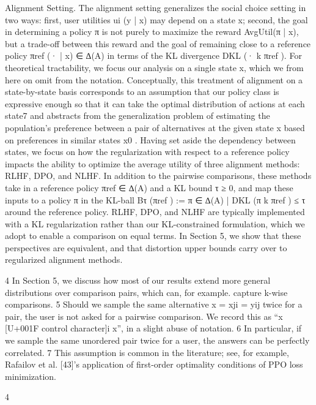 \documentclass[10pt]{article}
\begin{document}
\begin{ReviewVerbatim}

Alignment Setting. The alignment setting generalizes the social choice setting in two ways: first,
user utilities ui (y | x) may depend on a state x; second, the goal in determining a policy π is not
purely to maximize the reward AvgUtil(π | x), but a trade-off between this reward and the goal of
remaining close to a reference policy πref (· | x) ∈ ∆(A) in terms of the KL divergence DKL (· k πref ).
For theoretical tractability, we focus our analysis on a single state x, which we from here on omit
from the notation. Conceptually, this treatment of alignment on a state-by-state basis corresponds to
an assumption that our policy class is expressive enough so that it can take the optimal distribution of
actions at each state7 and abstracts from the generalization problem of estimating the population’s
preference between a pair of alternatives at the given state x based on preferences in similar states x0 .
Having set aside the dependency between states, we focus on how the regularization with respect
to a reference policy impacts the ability to optimize the average utility of three alignment methods:
RLHF, DPO, and NLHF. In addition to the pairwise comparisons, these methods take in a reference
policy πref ∈ ∆(A) and a KL bound τ ≥ 0, and map these inputs to a policy π in the KL-ball
Bτ (πref ) := {π ∈ ∆(A) | DKL (π k πref ) ≤ τ } around the reference policy. RLHF, DPO, and NLHF
are typically implemented with a KL regularization rather than our KL-constrained formulation,
which we adopt to enable a comparison on equal terms. In Section 5, we show that these perspectives
are equivalent, and that distortion upper bounds carry over to regularized alignment methods.

   4
     In Section 5, we discuss how most of our results extend more general distributions over comparison pairs,
which can, for example. capture k-wise comparisons.
   5
     Should we sample the same alternative x = xji = yij twice for a pair, the user is not asked for a pairwise
comparison. We record this as “x [U+001F control character]i x”, in a slight abuse of notation.
   6
     In particular, if we sample the same unordered pair twice for a user, the answers can be perfectly correlated.
   7
     This assumption is common in the literature; see, for example, Rafailov et al. [43]’s application of first-order
optimality conditions of PPO loss minimization.


                                                           4


\end{ReviewVerbatim}
\end{document}
